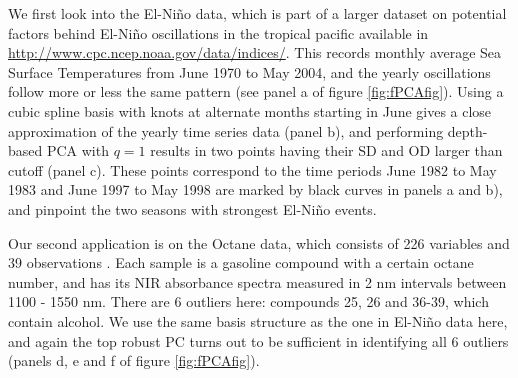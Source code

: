 We first look into the El-Ni\~no data, which is part of a larger dataset on potential factors behind El-Ni\~no oscillations in the tropical pacific available in \url{http://www.cpc.ncep.noaa.gov/data/indices/}. This records monthly average Sea Surface Temperatures from June 1970 to May 2004, and the yearly oscillations follow more or less the same pattern (see panel a of figure \ref{fig:fPCAfig}). Using a cubic spline basis with knots at alternate months starting in June gives a close approximation of the yearly time series data (panel b), and performing depth-based PCA with $q=1$ results in two points having their SD and OD larger than cutoff (panel c). These points correspond to the time periods June 1982 to May 1983 and June 1997 to May 1998 are marked by black curves in panels a and b), and pinpoint the two seasons with strongest El-Ni\~no events.

Our second application is on the Octane data, which consists of 226 variables and 39 observations \citep{esbensen94}. Each sample is a gasoline compound with a certain octane number, and has its NIR absorbance spectra measured in 2 nm intervals between 1100 - 1550 nm. There are 6 outliers here: compounds 25, 26 and 36-39, which contain alcohol. We use the same basis structure as the one in El-Ni\~no data here, and again the top robust PC turns out to be sufficient in identifying all 6 outliers (panels d, e and f of figure \ref{fig:fPCAfig}).
